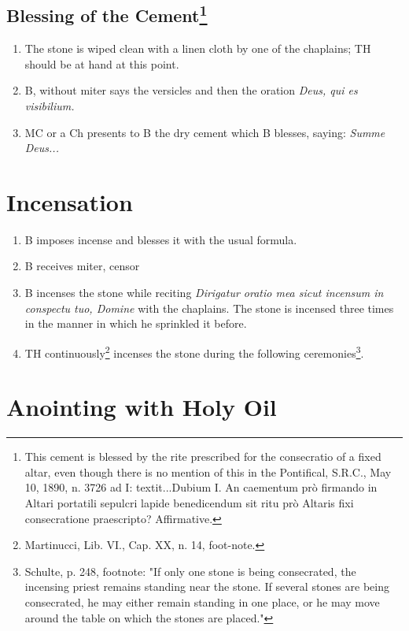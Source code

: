 \documentclass[letterpaper, twocolumn]{article}
\begin{document}
\subsection*{Blessing of the Cement\footnote{This cement is blessed by the rite prescribed for the consecratio of a fixed altar, even though there is no mention of this in the Pontifical, S.R.C., May 10, 1890, n. 3726 ad I: textit{...Dubium I. An caementum prò firmando in Altari portatili sepulcri lapide benedicendum sit ritu prò Altaris fixi consecratione praescripto? Affirmative.}}}
\begin{enumerate}
	\item The stone is wiped clean with a linen cloth by one of the chaplains; TH should be at hand at this point.
	\item B, without miter says the versicles and then the oration \textit{Deus, qui es visibilium.}
	\item MC or a Ch presents to B the dry cement which B blesses, saying: \textit{Summe Deus...}
\end{enumerate}
\section*{Incensation}
\begin{enumerate}
	\item B imposes incense and blesses it with the usual formula.
	\item B receives miter, censor
	\item B incenses the stone while reciting \textit{Dirigatur oratio mea sicut incensum in conspectu tuo, Domine} with the chaplains. The stone is incensed three times in the manner in which he sprinkled it before.
	\item TH continuously\footnote{Martinucci, Lib. VI., Cap. XX, n. 14, foot-note.} incenses the stone during the following ceremonies\footnote{Schulte, p. 248, footnote: "If only one stone is being consecrated, the incensing priest remains standing near the stone. If several stones are being consecrated, he may either remain standing in one place, or he may move around the table on which the stones are placed."}.
\end{enumerate}
\section*{Anointing with Holy Oil}
\end{document}

